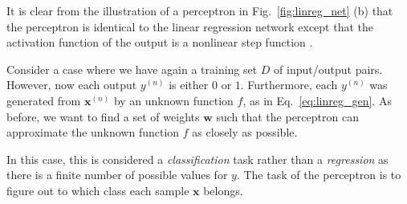 \documentclass[dissertation,nocontribution,draft*]{aaltoseries}
\newcommand{\vect}[1]{\mathbf{#1}}
\newcommand{\vx}[0]{\vect{x}}
\newcommand{\vw}[0]{\vect{w}}
\begin{document}
It is clear from the illustration of a perceptron in
Fig.~\ref{fig:linreg_net} (b) that the perceptron is
identical to the linear regression network except that the
activation function of the output is a nonlinear step
function \citep[see, e.g.,][]{Haykin2009}.

Consider a case where we have again a training set
$D$ of input/output pairs. However, now each output
$y^{(n)}$ is either $0$ or $1$. Furthermore, each $y^{(n)}$
was generated from $\vx^{(n)}$ by an unknown
function $f$, as in Eq.~\eqref{eq:linreg_gen}. As 
before, we want to find a set of weights $\vw$ such that the
perceptron can approximate the unknown function $f$ as
closely as possible.

In this case, this is considered a \textit{classification}
task rather than a \textit{regression} as there is a
finite number of possible values for $y$. The task of the
perceptron is to figure out to which class each sample $\vx$
belongs.
\end{document}

